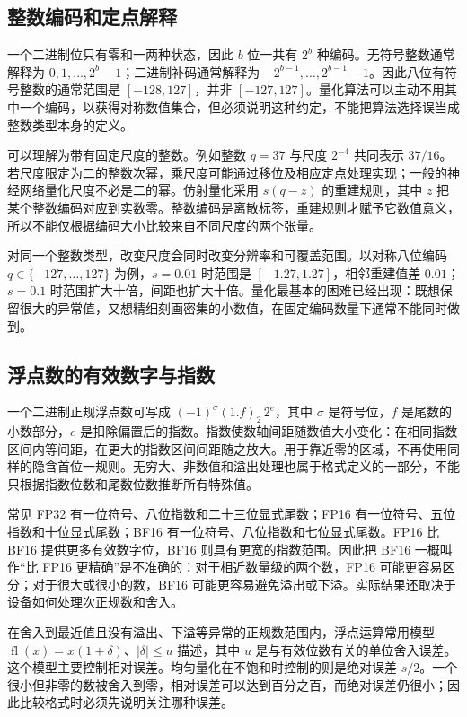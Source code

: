 \documentclass[UTF8,12pt,a4paper,fontset=fandol]{ctexart}
\begin{document}
\subsection{整数编码和定点解释}
一个二进制位只有零和一两种状态，因此 $b$ 位一共有 $2^b$ 种编码。无符号整数通常解释为 $0,1,\ldots,2^b-1$；二进制补码通常解释为 $-2^{b-1},\ldots,2^{b-1}-1$。因此八位有符号整数的通常范围是 $[-128,127]$，并非 $[-127,127]$。量化算法可以主动不用其中一个编码，以获得对称数值集合，但必须说明这种约定，不能把算法选择误当成整数类型本身的定义。

可以理解为带有固定尺度的整数。例如整数 $q=37$ 与尺度 $2^{-4}$ 共同表示 $37/16$。若尺度限定为二的整数次幂，乘尺度可能通过移位及相应定点处理实现；一般的神经网络量化尺度不必是二的幂。仿射量化采用 $s(q-z)$ 的重建规则，其中 $z$ 把某个整数编码对应到实数零。整数编码是离散标签，重建规则才赋予它数值意义，所以不能仅根据编码大小比较来自不同尺度的两个张量。

对同一个整数类型，改变尺度会同时改变分辨率和可覆盖范围。以对称八位编码 $q\in\{-127,\ldots,127\}$ 为例，$s=0.01$ 时范围是 $[-1.27,1.27]$，相邻重建值差 $0.01$；$s=0.1$ 时范围扩大十倍，间距也扩大十倍。量化最基本的困难已经出现：既想保留很大的异常值，又想精细刻画密集的小数值，在固定编码数量下通常不能同时做到。

\subsection{浮点数的有效数字与指数}
一个二进制正规浮点数可写成 $(-1)^\sigma(1.f)_2\,2^e$，其中 $\sigma$ 是符号位，$f$ 是尾数的小数部分，$e$ 是扣除偏置后的指数。指数使数轴间距随数值大小变化：在相同指数区间内等间距，在更大的指数区间间距随之放大。用于靠近零的区域，不再使用同样的隐含首位一规则。无穷大、非数值和溢出处理也属于格式定义的一部分，不能只根据指数位数和尾数位数推断所有特殊值。

常见 FP32 有一位符号、八位指数和二十三位显式尾数；FP16 有一位符号、五位指数和十位显式尾数；BF16 有一位符号、八位指数和七位显式尾数。FP16 比 BF16 提供更多有效数字位，BF16 则具有更宽的指数范围。因此把 BF16 一概叫作“比 FP16 更精确”是不准确的：对于相近数量级的两个数，FP16 可能更容易区分；对于很大或很小的数，BF16 可能更容易避免溢出或下溢。实际结果还取决于设备如何处理次正规数和舍入。

在舍入到最近值且没有溢出、下溢等异常的正规数范围内，浮点运算常用模型 $\operatorname{fl}(x)=x(1+\delta)$、$|\delta|\leq u$ 描述，其中 $u$ 是与有效位数有关的单位舍入误差。这个模型主要控制相对误差。均匀量化在不饱和时控制的则是绝对误差 $s/2$。一个很小但非零的数被舍入到零，相对误差可以达到百分之百，而绝对误差仍很小；因此比较格式时必须先说明关注哪种误差。
\end{document}
